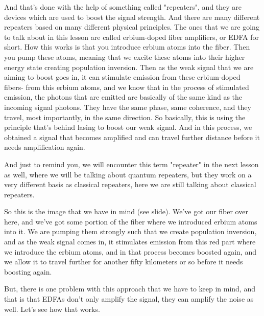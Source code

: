And that's done with the help of something called "repeaters", and they are devices which are used to boost the signal strength. And there are many different repeaters based on many different physical principles. The ones that we are going to talk about in this lesson are called erbium-doped fiber amplifiers, or EDFA for short. How this works is that you introduce erbium atoms into the fiber. Then you pump these atoms, meaning that we excite these atoms into their higher energy state creating population inversion. Then as the weak signal that we are aiming to boost goes in, it can stimulate emission from these erbium-doped fibers- from this erbium atoms, and we know that in the process of stimulated emission, the photons that are emitted are basically of the same kind as the incoming signal photons. They have the same phase, same coherence, and they travel, most importantly, in the same direction. So basically, this is using the principle that's behind lasing to boost our weak signal. And in this process, we obtained a signal that becomes amplified and can travel further distance before it needs amplification again.

And just to remind you, we will encounter this term "repeater" in the next lesson as well, where we will be talking about quantum repeaters, but they work on a very different basis as classical repeaters, here we are still talking about classical repeaters.

So this is the image that we have in mind (see slide). We've got our fiber over here, and we've got some portion of the fiber where we introduced erbium atoms into it. We are pumping them strongly such that we create population inversion, and as the weak signal comes in, it stimulates emission from this red part where we introduce the erbium atoms, and in that process becomes boosted again, and we allow it to travel further for another fifty kilometers or so before it needs boosting again.

But, there is one problem with this approach that we have to keep in mind, and that is that EDFAs don't only amplify the signal, they can amplify the noise as well. Let's see how that works.

